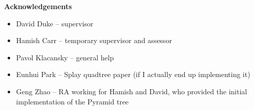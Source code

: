 \begin{center}
    {\LARGE\bf Acknowledgements}
\end{center}

\begin{itemize}
	\item David Duke -- supervisor
	\item Hamish Carr -- temporary supervisor and assessor
	\item Pavol Klacansky -- general help
	\item Eunhui Park -- Splay quadtree paper (if I actually end up implementing it)
	\item Geng Zhao -- RA working for Hamish and David, who provided the initial implementation of the Pyramid tree
\end{itemize}


